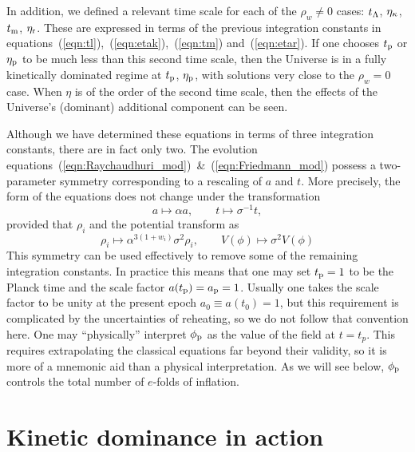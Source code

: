 In addition, we defined a relevant time scale for each of the $\rho_w \neq 0$ cases: $t_\mathrm{\Lambda}$, $\eta_\mathrm{\kappa}$, $t_{\mathrm{m}}$, $\eta_{\mathrm{r}}$. These are expressed in terms of the previous integration constants in equations~(\ref{eqn:tl}),~(\ref{eqn:etak}),~(\ref{eqn:tm}) and~(\ref{eqn:etar}). If one chooses $t_{\mathrm{p}}$ or $\eta_{\mathrm{p}}$ to be much less than this second time scale, then the Universe is in a fully kinetically dominated regime at $t_{\mathrm{p}}$, $\eta_{\mathrm{p}}$, with solutions very close to the $\rho_w=0$ case. When $\eta$ is of the order of the second time scale, then the effects of the Universe's (dominant) additional component can be seen.

Although we have determined these equations in terms of three integration constants, there are in fact only two.  The evolution equations~(\ref{eqn:Raychaudhuri_mod})~\&~(\ref{eqn:Friedmann_mod}) possess a two-parameter symmetry corresponding to a rescaling of $a$ and $t$. More precisely, the form of the equations does not change under the transformation
%
\begin{equation}
  a\mapsto\alpha a, 
  \qquad 
  t \mapsto\sigma^{-1}t,
\end{equation}
%
provided that $\rho_i$ and the potential transform as
%
\begin{equation}
  \rho_i \mapsto \alpha^{3(1+w_i)}\sigma^2\rho_i, 
  \qquad
  V(\phi) \mapsto \sigma^2 V(\phi)
\end{equation}
%
This symmetry can be used effectively to remove some of the remaining integration constants. In practice this means that one may set $t_{\mathrm{p}}=1$ to be the Planck time and the scale factor $a(t_{\mathrm{p}})=a_{\mathrm{p}}=1$. Usually one takes the scale factor to be unity at the present epoch $a_0\equiv a(t_0)=1$, but this requirement is complicated by the uncertainties of reheating, so we do not follow that convention here. One may ``physically'' interpret $\phi_{\mathrm{p}}$ as the value of the field at $t=t_p$.  This requires extrapolating the classical equations far beyond their validity, so it is more of a mnemonic aid than a physical interpretation.  As we will see below, $\phi_{\mathrm{p}}$ controls the total number of $e$-folds of inflation.













\section{Kinetic dominance in action}
\label{sec:Kinetic_dominance_in_action}

